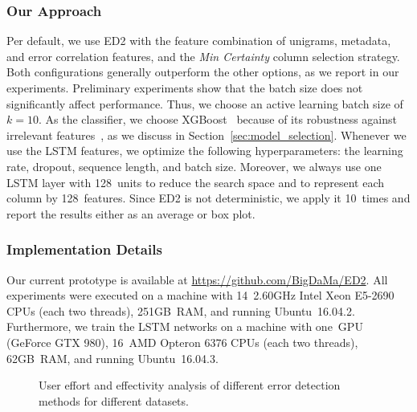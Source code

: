 \subsubsection{Our Approach}
Per default, we use ED2 with the feature combination of unigrams, metadata, and error correlation features, and the \emph{Min Certainty} column selection strategy. Both configurations generally outperform the other options, as we report in our experiments. 
Preliminary experiments show that the batch size does not significantly affect performance. Thus, we choose an active learning batch size of $k = 10$. As the classifier, we choose XGBoost~\cite{chen2016xgboost} because of its robustness against irrelevant features~\cite{friedman2001greedy}, as we discuss in Section~\ref{sec:model_selection}. Whenever we use the LSTM features, we optimize the following hyperparameters: the learning rate, dropout, sequence length, and batch size. Moreover, we always use one LSTM layer with 128~units to reduce the search space and to represent each column by 128~features.
Since ED2 is not deterministic, we apply it 10~times and report the results either as an average or box plot.


\subsubsection{Implementation Details}
Our current prototype is available at \url{https://github.com/BigDaMa/ED2}. All experiments were executed on a machine with 14~2.60GHz Intel Xeon E5-2690 CPUs (each two threads), 251GB~RAM, and running Ubuntu~16.04.2. Furthermore, we train the LSTM networks on a machine with one~GPU (GeForce GTX 980), 16~AMD Opteron 6376 CPUs (each two threads), 62GB~RAM, and running Ubuntu~16.04.3.


\begin{figure*}[ht!]
	\centering
	
	\caption{User effort and effectivity analysis of different error detection methods for different datasets.}
	\label{figure:methods_comparison_user_effort}
\end{figure*}


